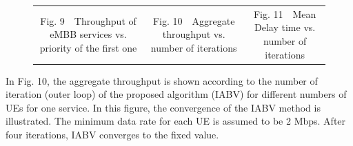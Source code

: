 \documentclass[lettersize,journal]{IEEEtran}
\begin{document}
\begin{figure}[!htb]
{\begin{tabular}{c@{}c@{}c}
			\scriptsize Fig. 9~~Throughput of eMBB services vs. priority of the first one  & \scriptsize Fig. 10~~Aggregate throughput vs. number of iterations  & \scriptsize Fig. 11~~Mean Delay time vs. number of iterations
	\end{tabular}}
	\vspace*{-3mm}
	\label{label}
\end{figure}


In Fig. 10, the aggregate throughput is shown according to the number of iteration (outer loop) of the
proposed algorithm (IABV) for different numbers of UEs for one service. In this figure, the convergence of the IABV method is illustrated. The minimum data rate for each UE is assumed to be 2 Mbps.
After four iterations, IABV converges to the fixed value.
\end{document}
